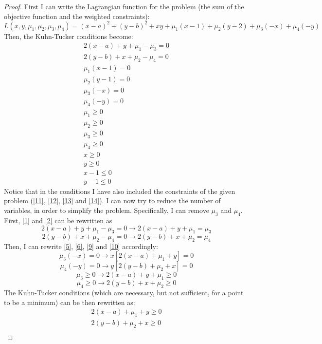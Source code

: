 \begin{proof}
    First I can write the Lagrangian function for the problem (the sum of the objective function and the weighted constraints):
    \[L(x,y,\mu_1,\mu_2,\mu_3,\mu_4) = (x-a)^2 + (y-b)^2 + xy + \mu_1(x-1) + \mu_2(y-2) + \mu_3(-x) + \mu_4(-y)\]
    Then, the Kuhn-Tucker conditions become:
    \begin{gather}
        2(x-a) + y + \mu_1 - \mu_3 = 0 \label{1} \\
        2(y-b) + x + \mu_2 - \mu_4 = 0 \label{2} \\
        \mu_1(x - 1) = 0 \label{3} \\
        \mu_2(y - 1) = 0 \label{4} \\
        \mu_3(-x) = 0 \label{5} \\
        \mu_4(-y) = 0 \label{6} \\
        \mu_1 \geq 0 \label{7} \\
        \mu_2 \geq 0 \label{8} \\
        \mu_3 \geq 0 \label{9} \\
        \mu_4 \geq 0 \label{10} \\
        x \geq 0 \label{11} \\
        y \geq 0 \label{12} \\
        x - 1 \leq 0 \label{13} \\
        y - 1 \leq 0 \label{14}
    \end{gather}
    Notice that in the conditions I have also included the constraints of the given problem (\eqref{11}, \eqref{12}, \eqref{13} and \eqref{14}). I can now try to reduce the number of variables, in order to simplify the problem. Specifically, I can remove \(\mu_3\) and \(\mu_4\). First, \eqref{1} and \eqref{2} can be rewritten as
    \[2(x-a) + y + \mu_1 - \mu_3 = 0 \rightarrow 2(x-a) + y + \mu_1 = \mu_3\]
    \[2(y-b) + x + \mu_2 - \mu_4 = 0 \rightarrow 2(y-b) + x + \mu_2 = \mu_4\]
    Then, I can rewrite \eqref{5}, \eqref{6}, \eqref{9} and \eqref{10} accordingly:
    \[\mu_3(-x) = 0 \rightarrow x[2(x-a) + \mu_1 + y] = 0\]
    \[\mu_4(-y) = 0 \rightarrow y[2(y-b) + \mu_2 + x] = 0\]
    \[\mu_3 \geq 0 \rightarrow 2(x-a) + y + \mu_1 \geq 0\]
    \[\mu_4 \geq 0 \rightarrow 2(y-b) + x + \mu_2 \geq 0\]
    The Kuhn-Tucker conditions (which are necessary, but not sufficient, for a point to be a minimum) can be then rewritten as:
    \begin{gather}
        2(x-a) + \mu_1 + y \geq 0 \label{KKT1} \tag{KKT1} \\
        2(y-b) + \mu_2 + x \geq 0 \label{KKT2} \tag{KKT2} \\

\end{gather}
\end{proof}
